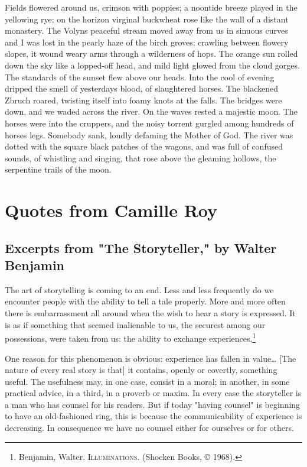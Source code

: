 \documentclass[
]{memoir}
\begin{document}
Fields flowered around us, crimson with poppies; a noontide breeze
played in the yellowing rye; on the horizon virginal buckwheat rose like
the wall of a distant monastery. The Volyns peaceful stream moved away
from us in sinuous curves and I was lost in the pearly haze of the birch
groves; crawling between flowery slopes, it wound weary arms through a
wilderness of hops. The orange sun rolled down the sky like a lopped-off
head, and mild light glowed from the cloud gorges. The standards of the
sunset flew above our heads. Into the cool of evening dripped the smell
of yesterdays blood, of slaughtered horses. The blackened Zbruch roared,
twisting itself into foamy knots at the falls. The bridges were down,
and we waded across the river. On the waves rested a majestic moon. The
horses were into the cruppers, and the noisy torrent gurgled among
hundreds of horses legs. Somebody sank, loudly defaming the Mother of
God. The river was dotted with the square black patches of the wagons,
and was full of confused sounds, of whistling and singing, that rose
above the gleaming hollows, the serpentine trails of the moon.

\hypertarget{quotes-from-camille-roy}{%
\section*{Quotes from Camille Roy}\label{quotes-from-camille-roy}}

\hypertarget{excerpts-from-the-storyteller-by-walter-benjamin}{%
\subsection*{Excerpts from "The Storyteller," by Walter
Benjamin}\label{excerpts-from-the-storyteller-by-walter-benjamin}}

The art of storytelling is coming to an end. Less and less frequently do
we encounter people with the ability to tell a tale properly. More and
more often there is embarrassment all around when the wish to hear a
story is expressed. It is as if something that seemed inalienable to us,
the securest among our possessions, were taken from us: the ability to
exchange experiences.\footnote{Benjamin, Walter. \textsc{Illuminations}.
  (Shocken Books, © 1968).}

One reason for this phenomenon is obvious: experience has fallen in
value\ldots{} {[}The nature of every real story is that{]} it contains,
openly or covertly, something useful. The usefulness may, in one case,
consist in a moral; in another, in some practical advice, in a third, in
a proverb or maxim. In every case the storyteller is a man who has
counsel for his readers. But if today "having counsel" is beginning to
have an old-fashioned ring, this is because the communicability of
experience is decreasing. In consequence we have no counsel either for
ourselves or for others.
\end{document}
